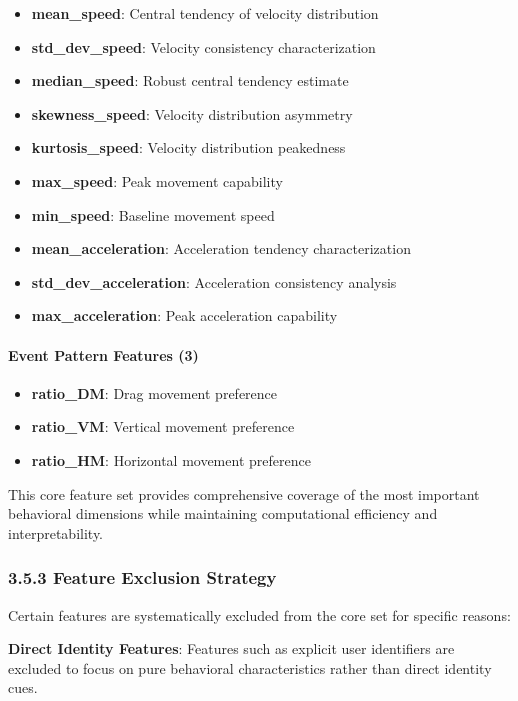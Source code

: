 \documentclass[
  11pt,
  a4paper,
]{article}
\providecommand{\tightlist}{%
  \setlength{\itemsep}{0pt}\setlength{\parskip}{0pt}}
\begin{document}
\begin{itemize}
\tightlist
\item
  \textbf{mean\_speed}: Central tendency of velocity distribution
\item
  \textbf{std\_dev\_speed}: Velocity consistency characterization
\item
  \textbf{median\_speed}: Robust central tendency estimate
\item
  \textbf{skewness\_speed}: Velocity distribution asymmetry
\item
  \textbf{kurtosis\_speed}: Velocity distribution peakedness
\item
  \textbf{max\_speed}: Peak movement capability
\item
  \textbf{min\_speed}: Baseline movement speed
\item
  \textbf{mean\_acceleration}: Acceleration tendency characterization
\item
  \textbf{std\_dev\_acceleration}: Acceleration consistency analysis
\item
  \textbf{max\_acceleration}: Peak acceleration capability
\end{itemize}

\paragraph{Event Pattern Features (3)}\label{event-pattern-features-3}

\begin{itemize}
\tightlist
\item
  \textbf{ratio\_DM}: Drag movement preference
\item
  \textbf{ratio\_VM}: Vertical movement preference
\item
  \textbf{ratio\_HM}: Horizontal movement preference
\end{itemize}

This core feature set provides comprehensive coverage of the most
important behavioral dimensions while maintaining computational
efficiency and interpretability.

\subsubsection{3.5.3 Feature Exclusion
Strategy}\label{feature-exclusion-strategy}

Certain features are systematically excluded from the core set for
specific reasons:

\textbf{Direct Identity Features}: Features such as explicit user
identifiers are excluded to focus on pure behavioral characteristics
rather than direct identity cues.
\end{document}
